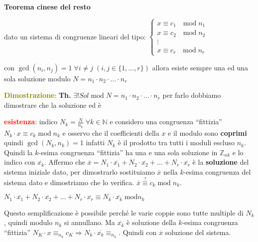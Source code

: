 \begin{flushleft}
    \textbf{Teorema cinese del resto}

    {\centering
        \begin{minipage}[t]{0.45\textwidth}
            dato un sistema di congruenze lineari del tipo:
            \begin{math}
                \begin{cases}
                    x \equiv c_1 \quad \text{mod} \; n_1 \\
                    x \equiv c_2 \quad \text{mod} \; n_2 \\
                    \vdots \\
                    x \equiv c_r \quad \text{mod} \; n_r
                \end{cases}
            \end{math}
        \end{minipage}
        \hfill
        \begin{minipage}[t]{0.45\textwidth}
            con $\gcd (n_i, n_j) = 1 \; \forall i \neq j \; (i, j \in \{1, ..., r\})$ allora esiste sempre una ed una sola soluzione modulo $N = n_1 \cdot n_2 \cdot ... \cdot n_r$
        \end{minipage}
    \par}
    \begin{boxA}
        \textcolor{olive}{\textbf{Dimostrazione}}: \textbf{Th.} $\exists ! Sol \; \text{mod} \; N = n_1 \cdot n_2 \cdot ... \cdot n_r$ per farlo dobbiamo dimostrare che la soluzione  ed è 

        \textcolor{red}{\textbf{esistenza}}: indico $N_k = \frac{N}{n_k} \; \forall k \in \mathbb{N}$ e considero una congruenza ``fittizia''  $N_k \cdot x \equiv c_k \; \text{mod} \; n_k$ e osservo che il coefficienti della $x$ e il modulo sono \textbf{coprimi} quindi $\gcd (N_k, n_k) = 1$ infatti $N_k$ è il prodotto tra tutti i moduli escluso $n_k$. Quindi la $k$-esima congruenza ``fittizia'' ha una e una sola soluzione in $\mathbb{Z}_{nk}$ e lo indico con $\overline{x_k}$. Affermo che $\overline{x} = N_1 \cdot \overline{x_1} + N_2 \cdot \overline{x_2} + ... + N_r \cdot \overline{x_r}$ è la \textbf{soluzione} del sistema iniziale dato, per dimostrarlo sostituiamo $\overline{x}$ nella $k$-esima congruenza del sistema dato e dimostriamo che lo verifica. $\overline{x} \overset{?}{\equiv} c_k \; \text{mod} \; n_k$.

        {\centering
            $N_1 \cdot \overline{x_1} + N_2 \cdot \overline{x_2} + ... + N_r \cdot \overline{x_r} \equiv N_k \cdot \overline{x_k} \; \text{mod} n_k$
        \par}
        Questo semplificazione è possibile perché le varie coppie sono tutte multiple di $N_k$, quindi modulo $n_k$ si annullano. Ma $\overline{x_k}$ è soluzione della $k$-esima congruenza ``fittizia'' $N_K \cdot x \equiv_{n_k} c_K \Rightarrow N_k \cdot \overline{x_k} \equiv_{n_k}$. Quindi  con $\overline{x}$ soluzione del sistema.


\end{boxA}
\end{flushleft}

